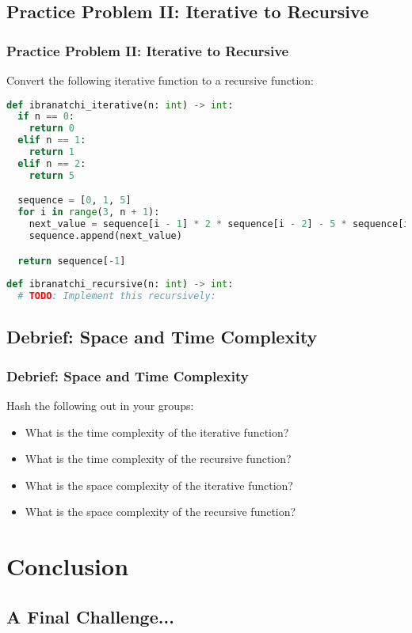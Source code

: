 \documentclass[hyperref={colorlinks,citecolor=blue,linkcolor=blue,urlcolor=blue}]{beamer}
\begin{document}
\subsection{Practice Problem II: Iterative to Recursive}

\begin{frame}[fragile]
  \frametitle{Practice Problem II: Iterative to Recursive}
  
  Convert the following iterative function to a recursive function:

  \begin{lstlisting}[language=Python, style=mystyle]
def ibranatchi_iterative(n: int) -> int:
  if n == 0:
    return 0
  elif n == 1:
    return 1
  elif n == 2:
    return 5

  sequence = [0, 1, 5]
  for i in range(3, n + 1):
    next_value = sequence[i - 1] * 2 * sequence[i - 2] - 5 * sequence[i - 3]
    sequence.append(next_value)

  return sequence[-1]
 
def ibranatchi_recursive(n: int) -> int:
  # TODO: Implement this recursively:

  \end{lstlisting}
\end{frame}
\subsection{Debrief: Space and Time Complexity}
\begin{frame}
  \frametitle{Debrief: Space and Time Complexity}
  Hash the following out in your groups:
  \begin{itemize}
    \item What is the time complexity of the iterative function?
    \item What is the time complexity of the recursive function?
    \item What is the space complexity of the iterative function?
    \item What is the space complexity of the recursive function?
\end{itemize}
\end{frame}

\section{Conclusion}
\subsection{A Final Challenge...}
\end{document}
